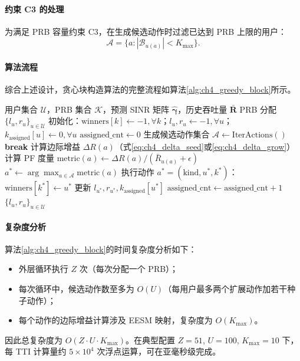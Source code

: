 \documentclass[type=master]{fduthesis}
\begin{document}
\paragraph{约束 C3 的处理}
为满足 PRB 容量约束 C3，在生成候选动作时过滤已达到 PRB 上限的用户：
\begin{equation}
\mathcal{A} = \{a : |\mathcal{B}_{u(a)}| < K_{\max}\}.
\label{eq:ch4_action_filter}
\end{equation}

\paragraph{算法流程}
综合上述设计，贪心块构造算法的完整流程如算法\ref{alg:ch4_greedy_block}所示。

\begin{algorithm}[t]
\caption{贪心块构造算法}
\label{alg:ch4_greedy_block}
\begin{algorithmic}[1]
\Require 用户集合 $\mathcal{U}$，PRB 集合 $\mathcal{K}$，预测 SINR 矩阵 $\hat{\boldsymbol{\gamma}}$，历史吞吐量 $\bar{\mathbf{R}}$
\Ensure PRB 分配 $\{l_u, r_u\}_{u \in \mathcal{U}}$
\State 初始化：$\text{winners}[k] \gets -1, \forall k$；$l_u, r_u \gets -1, \forall u$；$k_{\text{assigned}}[u] \gets 0, \forall u$
\State $\text{assigned\_cnt} \gets 0$
    \State 生成候选动作集合 $\mathcal{A} \gets \text{IterActions}()$ 
        \State \textbf{break} 
    \EndIf
        \State 计算边际增益 $\Delta R(a)$（式\eqref{eq:ch4_delta_seed}或\eqref{eq:ch4_delta_grow}）
        \State 计算 PF 度量 $\text{metric}(a) \gets \Delta R(a) / (\bar{R}_{u(a)} + \epsilon)$
    \EndFor
    \State $a^* \gets \arg\max_{a \in \mathcal{A}} \text{metric}(a)$
    \State 执行动作 $a^* = (\text{kind}, u^*, k^*)$：
    \State \quad $\text{winners}[k^*] \gets u^*$
    \State \quad 更新 $l_{u^*}, r_{u^*}, k_{\text{assigned}}[u^*]$
    \State $\text{assigned\_cnt} \gets \text{assigned\_cnt} + 1$
\EndWhile
\State \Return $\{l_u, r_u\}_{u \in \mathcal{U}}$
\end{algorithmic}
\end{algorithm}

\paragraph{复杂度分析}
算法\ref{alg:ch4_greedy_block}的时间复杂度分析如下：
\begin{itemize}
\item 外层循环执行 $Z$ 次（每次分配一个 PRB）；
\item 每次循环中，候选动作数至多为 $O(U)$（每用户最多两个扩展动作加若干种子动作）；
\item 每个动作的边际增益计算涉及 EESM 映射，复杂度为 $O(K_{\max})$。
\end{itemize}
因此总复杂度为 $O(Z \cdot U \cdot K_{\max})$。在典型配置 $Z = 51$, $U = 100$, $K_{\max} = 10$ 下，每 TTI 计算量约 $5 \times 10^4$ 次浮点运算，可在亚毫秒级完成。
\end{document}
